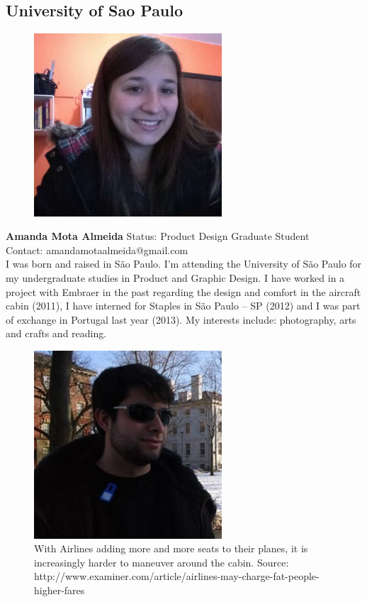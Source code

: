 \subsection*{University of Sao Paulo}

\begin{figure}[h]
  \centering
     \includegraphics[width=7cm]{images/image013}
  \label{fig:13}
\end{figure}

\textbf{Amanda Mota Almeida}
Status: Product Design Graduate Student \\
Contact: amandamotaalmeida@gmail.com \\
I was born and raised in São Paulo. I’m attending the University of São Paulo for my undergraduate studies in Product and Graphic Design. I have worked in a project with Embraer in the past regarding the design and comfort in the aircraft cabin (2011), I have interned for Staples in São Paulo – SP (2012) and I was part of exchange in Portugal last year (2013). My interests include: photography, arts and crafts and reading.

\begin{figure}[h]
  \centering
     \includegraphics[width=7cm]{images/image014}
   \caption{With Airlines adding more and more seats to their planes, it is increasingly harder to maneuver around the cabin.
                  Source: http://www.examiner.com/article/airlines-may-charge-fat-people-higher-fares}
  \label{fig:14}
\end{figure}

